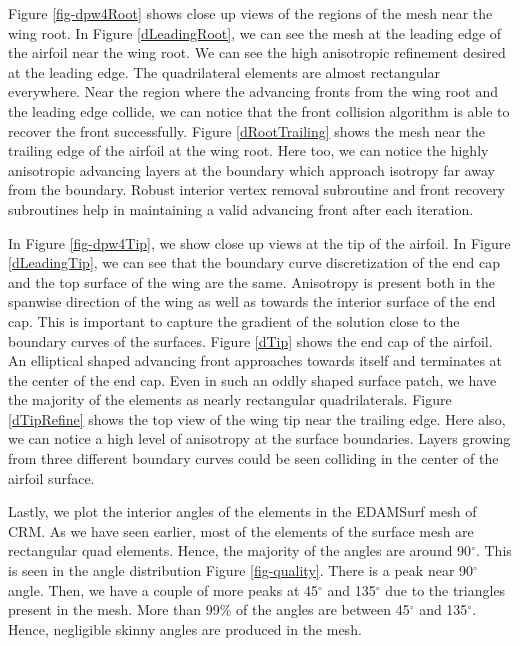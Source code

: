 Figure \ref{fig-dpw4Root} shows close up views of the regions of the mesh near the wing root. In Figure \ref{dLeadingRoot}, we can see the mesh at the leading edge of the airfoil near the wing root. We can see the high anisotropic refinement desired at the leading edge. The quadrilateral elements are almost rectangular everywhere. Near the region where the advancing fronts from the wing root and the leading edge collide, we can notice that the front collision algorithm is able to recover the front successfully. Figure \ref{dRootTrailing} shows the mesh near the trailing edge of the airfoil at the wing root. Here too, we can notice the highly anisotropic advancing layers at the boundary which approach isotropy far away from the boundary. Robust interior vertex removal subroutine and front recovery subroutines help in maintaining a valid advancing front after each iteration.

In Figure \ref{fig-dpw4Tip}, we show close up views at the tip of the airfoil. In Figure \ref{dLeadingTip}, we can see that the boundary curve discretization of the end cap and the top surface of the wing are the same. Anisotropy is present both in the spanwise direction of the wing as well as towards the interior surface of the end cap. This is important to capture the gradient of the solution close to the boundary curves of the surfaces. Figure \ref{dTip} shows the end cap of the airfoil. An elliptical shaped advancing front approaches towards itself and terminates at the center of the end cap. Even in such an oddly shaped surface patch, we have the majority of the elements as nearly rectangular quadrilaterals. Figure \ref{dTipRefine} shows the top view of the wing tip near the trailing edge. Here also, we can notice a high level of anisotropy at the surface boundaries. Layers growing from three different boundary curves could be seen colliding in the center of the airfoil surface. 

Lastly, we plot the interior angles of the elements in the EDAMSurf mesh of CRM. As we have seen earlier, most of the elements of the surface mesh are rectangular quad elements. Hence, the majority of the angles are around 90$^\circ$. This is seen in the angle distribution Figure \ref{fig-quality}. There is a peak near 90$^\circ$ angle. Then, we have a couple of more peaks at 45$^\circ$ and 135$^\circ$ due to the triangles present in the mesh. More than 99\% of the angles are between 45$^\circ$ and 135$^\circ$. Hence, negligible skinny angles are produced in the mesh.

